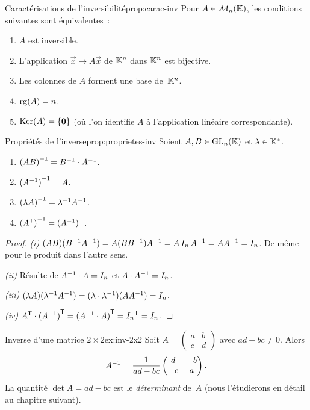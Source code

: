 \begin{proposition}{Caractérisations de l'inversibilité}{prop:carac-inv}
  Pour $A\in\mathcal{M}_n({\mathbb{K}})$, les conditions suivantes sont équivalentes~:
  \begin{enumerate}[label=(\roman*)]
    \item $A$ est inversible.
    \item L'application $\vec{x}\mapsto A\vec{x}$ de ${\mathbb{K}}^n$ dans ${\mathbb{K}}^n$
      est bijective.
    \item Les colonnes de $A$ forment une base de~${\mathbb{K}}^n$.
    \item $\operatorname{rg}(A)=n$.
    \item $\operatorname{Ker}(A)=\left\{\mathbf{0}\right\}$ (où l'on identifie $A$ à l'application
      linéaire correspondante).
  \end{enumerate}
\end{proposition}

\begin{proposition}{Propriétés de l'inverse}{prop:proprietes-inv}
  Soient $A,B\in\operatorname{GL}_n({\mathbb{K}})$ et $\lambda\in{\mathbb{K}}^*$.
  \begin{enumerate}[label=(\roman*)]
    \item ${(AB)}^{-1}={B}^{-1}\cdot{A}^{-1}$.
    \item ${({A}^{-1})}^{-1}=A$.
    \item ${(\lambda A)}^{-1}=\lambda^{-1}{A}^{-1}$.
    \item ${({A}^{\mathsf{T}})}^{-1}={({A}^{-1})}^{\mathsf{T}}$.
  \end{enumerate}
\end{proposition}

\begin{proof}
  \emph{(i)} $(AB)({B}^{-1}{A}^{-1})=A(B{B}^{-1}){A}^{-1}=A\,I_n\,{A}^{-1}
  =A{A}^{-1}=I_n$. De même pour le produit dans l'autre sens.

  \emph{(ii)} Résulte de ${A}^{-1}\cdot A=I_n$ et $A\cdot{A}^{-1}=I_n$.

  \emph{(iii)} $(\lambda A)(\lambda^{-1}{A}^{-1})
  =(\lambda\cdot\lambda^{-1})(A{A}^{-1})=I_n$.

  \emph{(iv)} ${A}^{\mathsf{T}}\cdot{({A}^{-1})}^{\mathsf{T}}
  ={({A}^{-1}\cdot A)}^{\mathsf{T}}={I_n}^{\mathsf{T}}=I_n$.
\end{proof}

\begin{example}{Inverse d'une matrice $2\times 2$}{ex:inv-2x2}
  Soit $A=\begin{pmatrix}a&b\\c&d\end{pmatrix}$ avec $ad-bc\neq 0$.
  Alors
  \[
    {A}^{-1}=\frac{1}{ad-bc}\begin{pmatrix}d&-b\\-c&a\end{pmatrix}.
  \]
  La quantité $\det A=ad-bc$ est le \emph{déterminant}
  de~$A$ (nous l'étudierons en détail au chapitre suivant).
\end{example}

